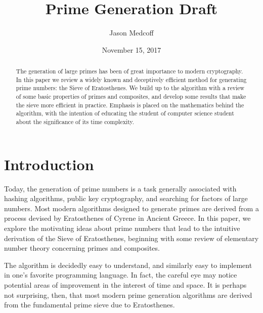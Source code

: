 \documentclass{amsart}
\title{Prime Generation Draft}
\author{Jason Medcoff}
\date{November 15, 2017}
\theoremstyle{definition}
\theoremstyle{case}
\begin{document}
    \maketitle
    
    \begin{abstract}
    	The generation of large primes has been of great importance to modern cryptography. In this paper we review a widely known and deceptively efficient method for generating prime numbers: the Sieve of Eratosthenes. We build up to the algorithm with a review of some basic properties of primes and composites, and develop some results that make the sieve more efficient in practice.
    	Emphasis is placed on the mathematics behind the algorithm, with the intention of educating the student of computer science student about the significance of its time complexity.
    \end{abstract}
    
    
    
    \section{Introduction}
    
    Today, the generation of prime numbers is a task generally associated with hashing algorithms, public key cryptography, and searching for factors of large numbers. Most modern algorithms designed to generate primes are derived from a process devised by Eratosthenes of Cyrene in Ancient Greece. In this paper, we explore the motivating ideas about prime numbers that lead to the intuitive derivation of the Sieve of Eratosthenes, beginning with some review of elementary number theory concerning primes and composites.
        
    The algorithm is decidedly easy to understand, and similarly easy to implement in one's favorite programming language. In fact, the careful eye may notice potential areas of improvement in the interest of time and space. It is perhaps not surprising, then, that most modern prime generation algorithms are derived from the fundamental prime sieve due to Eratosthenes.
    
\end{document}
